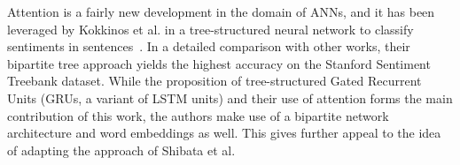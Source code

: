 Attention is a fairly new development in the domain of ANNs, and it has been leveraged by Kokkinos et al. in a tree-structured neural network to classify sentiments in sentences~\cite{kokkinos2017structural}. In a detailed comparison with other works, their bipartite tree approach yields the highest accuracy on the Stanford Sentiment Treebank dataset. While the proposition of tree-structured Gated Recurrent Units (GRUs, a variant of LSTM units) and their use of attention forms the main contribution of this work, the authors make use of a bipartite network architecture and word embeddings as well. This gives further appeal to the idea of adapting the approach of Shibata et al.
